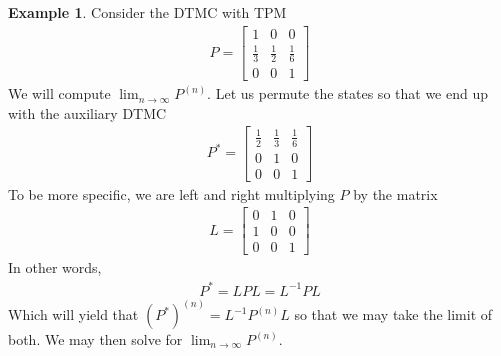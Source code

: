 \documentclass[11pt]{amsart}
\theoremstyle{definition}
\newtheorem{example}[theorem]{Example}
\numberwithin{equation}{section}
\begin{document}
 \begin{example}
     Consider the DTMC with TPM
     \begin{align*}
         P=\begin{bmatrix}
             1 & 0 & 0\\
             \frac{1}{3} & \frac{1}{2} & \frac{1}{6}\\
             0 & 0 & 1
         \end{bmatrix}
     \end{align*}
     We will compute $\lim_{n\to\infty} P^{(n)}$. Let us permute the states so that we end up with the auxiliary DTMC
     \begin{align*}
         P^{*}=\begin{bmatrix}
             \frac{1}{2} & \frac{1}{3} & \frac{1}{6}\\
             0 & 1 & 0\\
             0 & 0 & 1
         \end{bmatrix}
     \end{align*}
     To be more specific, we are left and right multiplying $P$ by the matrix
     \begin{align*}
             L=\begin{bmatrix}
                     0 & 1 & 0\\
                     1 & 0 & 0\\
                     0 & 0 & 1
             \end{bmatrix}
     \end{align*}
     In other words,
     \begin{align*}
         P^*=LPL=L^{-1}PL
     \end{align*}
     Which will yield that $(P^*)^{(n)}=L^{-1}P^{(n)}L$ so that we may take the limit of both. We may then solve for $\lim_{n\to\infty}P^{(n)}$.


\end{example}
\end{document}
